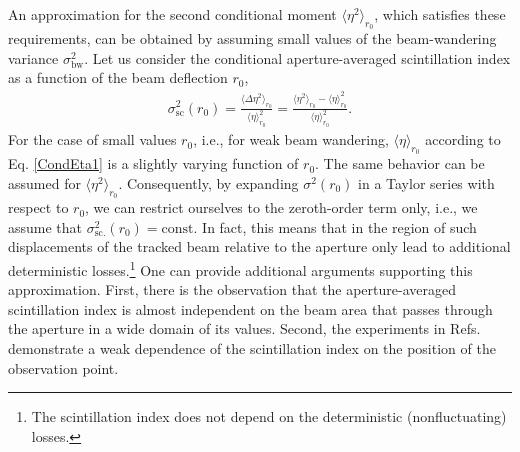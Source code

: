 \documentclass[aps,pra,twocolumn,a4paper,nofootinbib,preprintnumbers] {revtex4-1}
\begin{document}
	An approximation for the second conditional moment $\langle\eta^2\rangle_{{r}_0}$, which satisfies these requirements, can be obtained by assuming small values of the beam-wandering variance $\sigma_{\mathrm{bw}}^2$.
	Let us consider the conditional aperture-averaged scintillation index as a function of the beam deflection $r_0$,
		\begin{align}\label{sint}
 		\sigma^2_\textrm{sc}(r_0)=\frac{\langle\Delta\eta^2\rangle_{r_0}}{\langle\eta\rangle_{r_0}^2}=\frac{\langle\eta^2\rangle_{r_0}-\langle\eta\rangle_{r_0}^2}{\langle\eta\rangle_{r_0}^2}.
 		\end{align}
	For the case of small values $r_0$, i.e., for weak beam wandering, $\langle\eta\rangle_{r_0}$ according to Eq. \eqref{CondEta1} is a slightly varying function of $r_0$.
	The same behavior can be assumed for $\langle\eta^2\rangle_{r_0}$.
	Consequently, by expanding $\sigma^2(r_0)$ in a Taylor series with respect to $r_0$, we can restrict ourselves to the zeroth-order term only, i.e., we assume that $\sigma^2_\textrm{sc.}(r_0)=\textrm{const}$.
	In fact, this means that in the region of such displacements of the tracked beam relative to the aperture only lead  to additional deterministic losses.\footnote{The scintillation index does not depend on the deterministic (nonfluctuating) losses.  }
	One can provide additional arguments  supporting this approximation.
	First, there is the observation \cite{Churnside, Andrews1999} that the aperture-averaged scintillation index is almost independent on the beam area that passes through the aperture in a wide domain of its values.
	Second, the experiments in Refs. \cite{Vorontsov, Gurvich} demonstrate a weak dependence of the scintillation index on the position of  the observation point.
	
		
	
\end{document}
